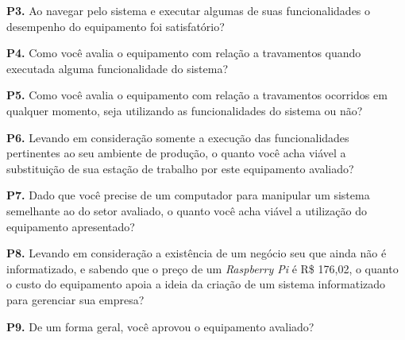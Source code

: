 \textbf{P3.} Ao navegar pelo sistema e executar algumas de suas funcionalidades o desempenho do equipamento foi satisfatório?

\textbf{P4.} Como você avalia o equipamento com relação a travamentos quando executada alguma funcionalidade do sistema?

\textbf{P5.} Como você avalia o equipamento com relação a travamentos ocorridos em qualquer momento, seja utilizando as funcionalidades do sistema ou não?

\textbf{P6.} Levando em consideração somente a execução das funcionalidades pertinentes ao seu ambiente de produção, o quanto você acha viável a substituição de sua estação de trabalho por este equipamento avaliado?

\textbf{P7.} Dado que você precise de um computador para manipular um sistema semelhante ao do setor avaliado, o quanto você acha viável a utilização do equipamento apresentado?

\textbf{P8.} Levando em consideração a existência de um negócio seu que ainda não é informatizado, e sabendo que o preço de um \textit{Raspberry Pi} é  R\$ 176,02, o quanto o custo do equipamento apoia a ideia da criação de um sistema informatizado para gerenciar sua empresa?

\textbf{P9.} De um forma geral, você aprovou o equipamento avaliado?
